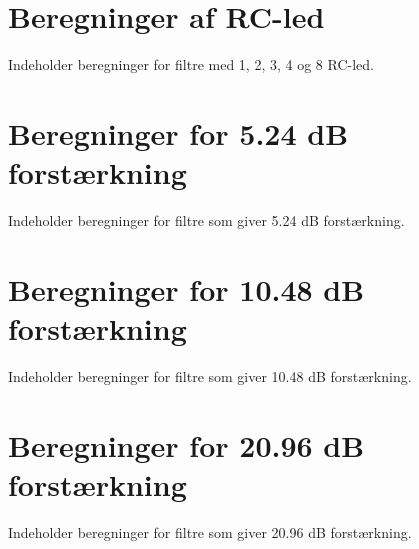
%

%



%
\chapter{Beregninger af RC-led}
Indeholder beregninger for filtre med 1, 2, 3, 4 og 8 RC-led.
\label{app:Beregninger af RC-led}

%
\chapter{Beregninger for 5.24 dB forstærkning}
Indeholder beregninger for filtre som giver 5.24 dB forstærkning.
\label{app:3RCledGain5.24}

%
\chapter{Beregninger for 10.48 dB forstærkning}
Indeholder beregninger for filtre som giver 10.48 dB forstærkning.
\label{app:3RCledGain10.48}

%
\chapter{Beregninger for 20.96 dB forstærkning}
Indeholder beregninger for filtre som giver 20.96 dB forstærkning.
\label{app:3RCledGain20.96}

%
%
%
%